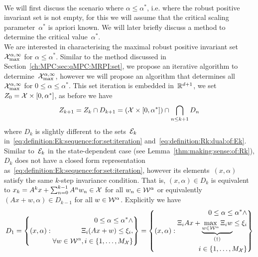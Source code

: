 %
\\[1em]
%
We will first discuss the scenario where $\alpha\leq\alpha^\ast$, i.e. where the robust positive invariant set is not empty, for this we will assume that the critical scaling parameter~$\alpha^\ast$ is apriori known.
%
We will later briefly discuss a method to determine the critical value~$\alpha^\ast$.
%
\\[1em]
%
\mysplit We are interested in characterising the maximal robust positive invariant set~$\mathcal X^{\alpha,\infty}_{\max}$ for $\alpha\leq\alpha^\ast$.
%
Similar to the method discussed in Section~\ref{ch:MPC:sec:qMPC:MRPI:set}, we propose an iterative algorithm to determine~$\mathcal X^{\alpha,\infty}_{\max}$, however we will propose an algorithm that determines all~$\mathcal X^{\alpha,\infty}_{\max}$ for $0\leq\alpha\leq\alpha^\ast$.
%
This set iteration is embedded in~$\mathbb R^{d+1}$, we set~$Z_0 = \mathcal X\times[0,\alpha^\ast]$, as before we have
%
\begin{equation}\label{eq:definition:Dk:sequence:scaled:disturbances}
	Z_{k+1} = Z_k\cap D_{k+1} = \left(\mathcal X\times[0,\alpha^\ast]\right)\cap \bigcap_{n\leq k+1}D_{n}
\end{equation}
%
where $D_k$ is slightly different to the sets~$\mathcal E_k$ in~\eqref{eq:definition:Ek:sequence:for:set:iteration} and~\eqref{eq:definition:Rk:dual:of:Ek}.
%
Similar to~$\mathcal E_k$ in the state-dependent case (see Lemma~\ref{thm:making:sense:of:Rk}), $D_k$ does not have a closed form representation as~\eqref{eq:definition:Ek:sequence:for:set:iteration}, however its elements~$(x,\alpha)$ satisfy the same $k$-step invariance condition.
%
That is, $(x,\alpha)\in D_k$ is equivalent to $x_k = A^k x+ \sum_{n=0}^{k-1}A^n w_n\in\mathcal X$ for all $w_n\in\mathcal W^\alpha$ or equivalently $(Ax+w,\alpha)\in D_{k-1}$ for all $w\in\mathcal W^\alpha$.
%
Explicitly we have
%
\begin{equation}
	D_1 = \left\{(x,\alpha):\begin{aligned}0\leq\alpha\leq\alpha^\ast\wedge\\
	\Xi_i (Ax+w)\leq\xi_i,\\
	\forall w\in\mathcal W^\alpha,i\in\{1,\dots,M_\mathcal X\}\end{aligned}\right\}= \left\{(x,\alpha):\begin{aligned}0\leq\alpha\leq\alpha^\ast\wedge\\
	\Xi_iAx+\underbrace{\max_{w\in\mathcal W^\alpha}\Xi_iw}_{(\dagger)}\leq\xi_i\\ i\in\{1,\dots,M_\mathcal X\}\end{aligned} \right\}
\end{equation}
